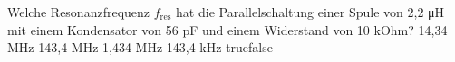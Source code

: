     {Welche Resonanzfrequenz $f_{\textrm{res}}$ hat die Parallelschaltung einer Spule von 2,2 \si{\micro\henry} mit einem Kondensator von 56 pF und einem Widerstand von 10 kOhm?}
    {14,34 MHz}
    {143,4 MHz}
    {1,434 MHz}
    {143,4 kHz}
    {true}{false}